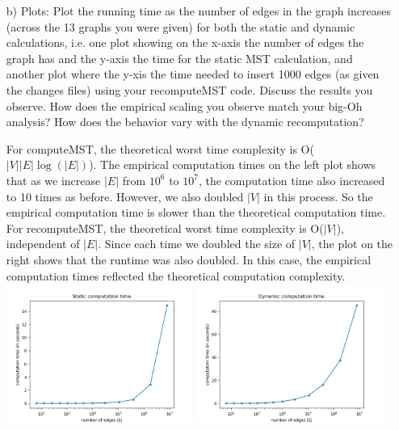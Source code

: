 \documentclass{article}
\begin{document}
\begin{itemize}
\item[b)] Plots: Plot the running time as the number of edges in the graph
increases (across the 13 graphs you were given) for both the static and dynamic
calculations, i.e. one plot showing on the x-axis the number of edges the graph
has and the y-axis the time for the static MST calculation, and another plot
where the y-xis the time needed to insert {\color{red} 1000} edges (as given
the changes files) using your recomputeMST code. Discuss the results you
observe. How does the empirical scaling you observe match your big-Oh analysis?
How does the behavior vary with the dynamic recomputation?
\begin{tcolorbox}
For computeMST, the theoretical worst time complexity is O($|V||E|\log(|E|)$). 
The empirical computation times on the left plot shows that as we increase $|E|$ from $10^6$
to $10^7$, the computation time also increased to 10 times as before. However, we also doubled 
$|V|$ in this process. So the empirical computation time is slower than the theoretical computation time.\\

For recomputeMST, the theoretical worst time complexity is O($|V|$), independent of $|E|$. Since each time
we doubled the size of $|V|$, the plot on the right shows that the runtime was also doubled. In this case, the 
empirical computation times reflected the theoretical computation complexity. \\
\includegraphics[width=0.48\textwidth]{static.png}
 \includegraphics[width=0.48\textwidth]{dynamic.png}
\end{tcolorbox}

\end{itemize}
\end{document}
